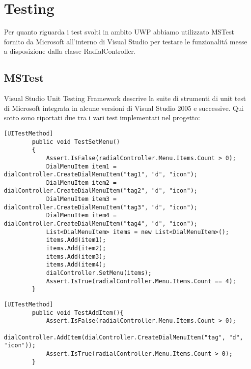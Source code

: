 \chapter{Testing}
\label{chap:Capitolo1}

Per quanto riguarda i test svolti in ambito UWP abbiamo utilizzato MSTest fornito da Microsoft all’interno di Visual Studio per testare le funzionalitá messe a disposizione dalla classe RadialController.

\section{MSTest}
Visual Studio Unit Testing Framework descrive la suite di strumenti di unit test di Microsoft integrata in alcune versioni di Visual Studio 2005 e successive.
Qui sotto sono riportati due tra i vari test implementati nel progetto:
 
\vspace{1.0cm}
\begin{lstlisting}[caption={Test SetMenu},style=javaScriptCode]
    [UITestMethod]
        public void TestSetMenu()
        {
            Assert.IsFalse(radialController.Menu.Items.Count > 0);
            DialMenuItem item1 = dialController.CreateDialMenuItem("tag1", "d", "icon");
            DialMenuItem item2 = dialController.CreateDialMenuItem("tag2", "d", "icon");
            DialMenuItem item3 = dialController.CreateDialMenuItem("tag3", "d", "icon");
            DialMenuItem item4 = dialController.CreateDialMenuItem("tag4", "d", "icon");
            List<DialMenuItem> items = new List<DialMenuItem>();
            items.Add(item1);
            items.Add(item2);
            items.Add(item3);
            items.Add(item4);
            dialController.SetMenu(items);
            Assert.IsTrue(radialController.Menu.Items.Count == 4);
        }
\end{lstlisting} 
\vspace{1.0cm}

\vspace{1.0cm}
\begin{lstlisting}[caption={Test aggiunta voce di Menu'},style=javaScriptCode]
  [UITestMethod]
        public void TestAddItem(){
            Assert.IsFalse(radialController.Menu.Items.Count > 0);
            dialController.AddItem(dialController.CreateDialMenuItem("tag", "d", "icon"));
            Assert.IsTrue(radialController.Menu.Items.Count > 0);
        }
\end{lstlisting} 
\vspace{1.0cm}
